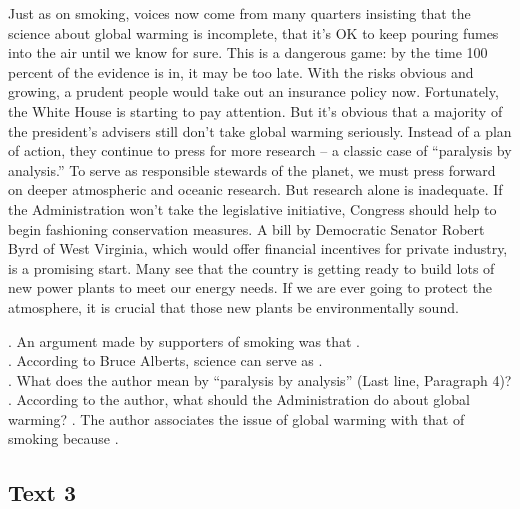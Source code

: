 Just as on smoking, voices now come from many quarters insisting that the science about global warming is incomplete, that it’s OK to keep pouring fumes into the air until we know for sure. This is a dangerous game: by the time 100 percent of the evidence is in, it may be too late. With the risks obvious and growing, a prudent people would take out an insurance policy now.
Fortunately, the White House is starting to pay attention. But it’s obvious that a majority of the president’s advisers still don’t take global warming seriously. Instead of a plan of action, they continue to press for more research -- a classic case of “paralysis by analysis.”
To serve as responsible stewards of the planet, we must press forward on deeper atmospheric and oceanic research. But research alone is inadequate. If the Administration won’t take the legislative initiative, Congress should help to begin fashioning conservation measures. A bill by Democratic Senator Robert Byrd of West Virginia, which would offer financial incentives for private industry, is a promising start. Many see that the country is getting ready to build lots of new power plants to meet our energy needs. If we are ever going to protect the atmosphere, it is crucial that those new plants be environmentally sound.
\begin{questions}  .	An argument made by supporters of smoking was that \ltk{}.\\
 .	According to Bruce Alberts, science can serve as \ltk{}.\\
 .	What does the author mean by “paralysis by analysis” (Last line, Paragraph 4)?
 .	According to the author, what should the Administration do about global warming?
 .	The author associates the issue of global warming with that of smoking because \ltk{}.\\
\end{questions}    \subsection{Text 3}
